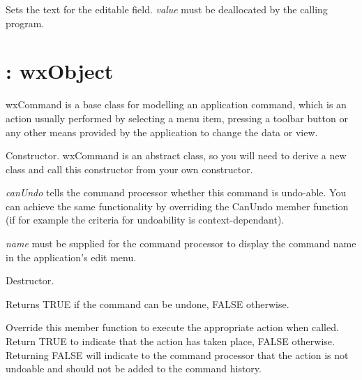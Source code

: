 %
%



Sets the text for the editable field. {\it value} must be deallocated by the calling program.



\section{: wxObject}\label{wxcommand}


wxCommand is a base class for modelling an application command,
which is an action usually performed by selecting a menu item, pressing
a toolbar button or any other means provided by the application to
change the data or view.



Constructor. wxCommand is an abstract class, so you will need to derive
a new class and call this constructor from your own constructor.

{\it canUndo} tells the command processor whether this command is undo-able. You
can achieve the same functionality by overriding the CanUndo member function (if for example
the criteria for undoability is context-dependant).

{\it name} must be supplied for the command processor to display the command name
in the application's edit menu.



Destructor.



Returns TRUE if the command can be undone, FALSE otherwise.



Override this member function to execute the appropriate action when called.
Return TRUE to indicate that the action has taken place, FALSE otherwise.
Returning FALSE will indicate to the command processor that the action is
not undoable and should not be added to the command history.

